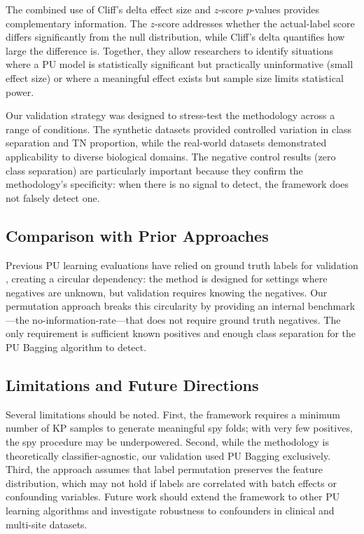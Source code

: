 \documentclass[12pt]{article}
\begin{document}
The combined use of Cliff's delta effect size and $z$-score $p$-values provides complementary information. The $z$-score addresses whether the actual-label score differs significantly from the null distribution, while Cliff's delta quantifies how large the difference is. Together, they allow researchers to identify situations where a PU model is statistically significant but practically uninformative (small effect size) or where a meaningful effect exists but sample size limits statistical power.

Our validation strategy was designed to stress-test the methodology across a range of conditions. The synthetic datasets provided controlled variation in class separation and TN proportion, while the real-world datasets demonstrated applicability to diverse biological domains. The negative control results (zero class separation) are particularly important because they confirm the methodology's specificity: when there is no signal to detect, the framework does not falsely detect one.

\subsection{Comparison with Prior Approaches}

Previous PU learning evaluations have relied on ground truth labels for validation \citep{elkan2008learning, mordelet2014bagging}, creating a circular dependency: the method is designed for settings where negatives are unknown, but validation requires knowing the negatives. Our permutation approach breaks this circularity by providing an internal benchmark---the no-information-rate---that does not require ground truth negatives. The only requirement is sufficient known positives and enough class separation for the PU Bagging algorithm to detect.

\subsection{Limitations and Future Directions}

Several limitations should be noted. First, the framework requires a minimum number of KP samples to generate meaningful spy folds; with very few positives, the spy procedure may be underpowered. Second, while the methodology is theoretically classifier-agnostic, our validation used PU Bagging exclusively. Third, the approach assumes that label permutation preserves the feature distribution, which may not hold if labels are correlated with batch effects or confounding variables. Future work should extend the framework to other PU learning algorithms and investigate robustness to confounders in clinical and multi-site datasets.
\end{document}

